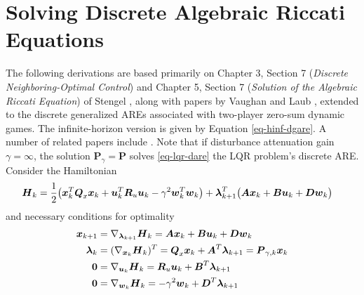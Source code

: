 \chapter{Solving Discrete Algebraic Riccati Equations}
\label{appendix:numericalMethods}
The following derivations are based primarily on Chapter 3, Section 7 (\emph{Discrete Neighboring-Optimal Control}) and Chapter 5, Section 7 (\emph{Solution of the Algebraic Riccati Equation}) of Stengel \cite{stengel}, along with papers by Vaughan \cite{vaughan1970nonrecursive} and Laub \cite{laub1979schur}, extended to the discrete generalized AREs associated with two-player zero-sum dynamic games.  The infinite-horizon version is given by Equation \eqref{eq-hinf-dgare}.  A number of related papers include \cite{pappas1980numerical, gardiner1986generalization, aliev1992discrete, gudmundsson1992scaling, chen1994non, takaba1996discrete, feng2009solving, rojas2011discrete}.  Note that if disturbance attenuation gain $\gamma = \infty$, the solution $\mathbf{P}_{\gamma} = \mathbf{P}$ solves \eqref{eq-lqr-dare} the LQR problem's discrete ARE.  Consider the Hamiltonian
\begin{equation}
\begin{aligned}
	\vb*{H}_{k} &= \frac{1}{2} \big{(} \vb*{x}_{k}^{T}\vb*{Q}_{x}\vb*{x}_{k}
			+ \vb*{u}_{k}^{T}\vb*{R}_{u}\vb*{u}_{k}
			- \gamma^{2} \vb*{w}_{k}^{T}\vb*{w}_{k} \big{)} + 
			\vb*{\lambda}_{k+1}^{T} \big{(} \vb*{A}\vb*{x}_{k}
			+ \vb*{B}\vb*{u}_{k} + \vb*{D}\vb*{w}_{k} \big{)}
\end{aligned} \label{hamiltonian}
\end{equation}
and necessary conditions for optimality
\begin{subequations}
\begin{align}
	\vb*{x}_{k+1} &= \nabla_{\vb*{\lambda}_{k+1}} \vb*{H}_{k}
		= \vb*{A}\vb*{x}_{k} + \vb*{B}\vb*{u}_{k} + \vb*{D}\vb*{w}_{k}\\
	\vb*{\lambda}_{k} &= (\nabla_{\vb*{x}_{k}} \vb*{H}_{k})^{T}
		= \vb*{Q}_{x}\vb*{x}_{k} +  \vb*{A}^{T}\vb*{\lambda}_{k+1}
		= \vb*{P}_{\gamma,k} \vb*{x}_{k}\\
	\vb*{0} &= \nabla_{\vb*{u}_{k}} \vb*{H}_{k}
		= \vb*{R}_{u}\vb*{u}_{k} +  \vb*{B}^{T}\vb*{\lambda}_{k+1}\\
	\vb*{0} &= \nabla_{\vb*{w}_{k}} \vb*{H}_{k}
		= - \gamma^{2} \vb*{w}_{k} +  \vb*{D}^{T}\vb*{\lambda}_{k+1}
\end{align} \label{conditions_for_optimality}
\end{subequations}


